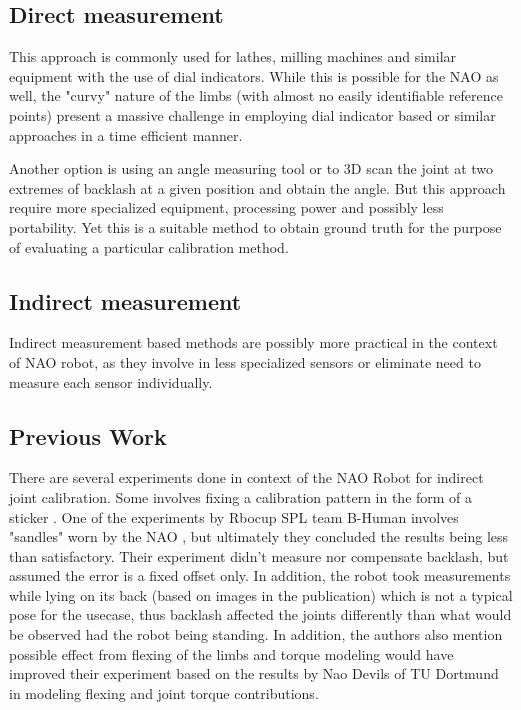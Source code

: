 \documentclass[english, printversion, nomenclature, notitle]{tuvisionthesis} %
\begin{document}
\subsection{Direct measurement}

This approach is commonly used for lathes, milling machines and similar equipment with the use of dial indicators. While this is possible for the NAO as well, the "curvy" nature of the limbs (with almost no easily identifiable reference points) present a massive challenge in employing dial indicator based or similar approaches in a time efficient manner.

Another option is using an angle measuring tool or to 3D scan the joint at  two extremes of backlash at a given position and obtain the angle. But this approach require more specialized equipment, processing power and possibly less portability. Yet this is a suitable method to obtain ground truth for the purpose of evaluating a particular calibration method. 

\subsection{Indirect measurement}
Indirect measurement based methods are possibly more practical in the context of NAO robot, as they involve in less specialized sensors or eliminate need to measure each sensor individually.
\subsection{Previous Work}
\label{subsec:joint_calib_previous_work}

There are several experiments done in context of the NAO Robot for indirect joint calibration. Some involves fixing a calibration pattern in the form of a sticker \cite{maier_whole-body_2015}. One of the experiments by Rbocup SPL team B-Human involves "sandles" worn by the NAO \cite{kastner_automatic_2015}, but ultimately they concluded the results being less than satisfactory. Their experiment didn't measure nor compensate backlash, but assumed the error is a fixed offset only. In addition, the robot took measurements while lying on its back (based on images in the publication) which is not a typical pose for the usecase, thus backlash affected the joints differently than what would be observed had the robot being standing. In addition, the authors also mention possible effect from flexing of the limbs and torque modeling would have improved their experiment based on the results by Nao Devils of TU Dortmund in modeling flexing and joint torque contributions. 
\end{document}
